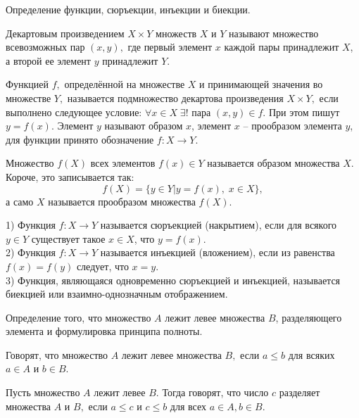 \begin{problem}
Определение функции, сюръекции, инъекции и биекции.
\end{problem}

\begin{definition}
	Декартовым произведением $X\times Y$
	множеств $X$ и $Y$ называют множество
	всевозможных пар $(x, y),$ где первый
	элемент $x$ каждой пары принадлежит $X$,
	а второй ее элемент $y$ принадлежит $Y$.
\end{definition}
\begin{definition}
	Функцией $f,$ определённой на множестве $X$ и
	принимающей значения во множестве $Y,$
	называется подмножество декартова
	произведения $X\times Y,$ если
	выполнено следующее условие:
	$\forall x\in X\;\exists! \textrm{ пара }
		(x, y)\in f$. При этом пишут $y=f(x)$.
	Элемент $y$ называют образом $x$,
	элемент $x$ -- прообразом элемента
	$y$, для функции принято обозначение
	$f: X\rightarrow Y$.

	Множество $f(X)$ всех элементов $f(x)\in
		Y$ называется образом множества $X$.
	Короче, это записывается так:
	$$
		f(X)=\{y\in Y|y=f(x), \;x\in X\},
	$$
	а само $X$ называется прообразом
	множества $f(X)$.
\end{definition}

\begin{definition}
	1) Функция $f: X\rightarrow Y$
	называется сюръекцией
	(накрытием), если для всякого
	$y\in Y$ существует такое $x\in X$,
	что $y=f(x)$.\\
	2) Функция $f: X\rightarrow Y$
	называется инъекцией
	(вложением), если из равенства
	$f(x)=f(y)$ следует, что $x=y$.\\
	3) Функция, являющаяся одновременно
	сюръекцией и инъекцией, называется
	биекцией или взаимно-однозначным
	отображением.
\end{definition}

\newpage
\begin{problem}
Определение того, что множество $A$ лежит левее множества $B$, разделяющего элемента
и формулировка принципа полноты.
\end{problem}

\begin{definition}
	Говорят, что
	множество $A$ лежит левее множества
	$B,$ если $a\leq b$ для всяких $a\in A$
	и $b\in B$.
\end{definition}

\begin{definition}
	Пусть
	множество $A$ лежит левее $B$.
	Тогда говорят, что число $c$
	разделяет множества $A$ и $B,$
	если $a\leq c$ и $c\leq b$
	для всех $a\in A, b\in B$.
\end{definition}

